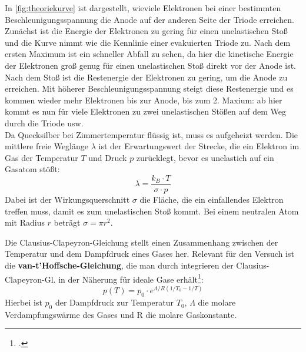 In \cref{fig:theoriekurve} ist dargestellt, wieviele Elektronen bei einer bestimmten Beschleunigungsspannung die Anode auf der anderen Seite der Triode erreichen. Zunächst ist die Energie der Elektronen zu gering für einen unelastischen Stoß und die Kurve nimmt wie die Kennlinie einer evakuierten Triode zu. Nach dem ersten Maximum ist ein schneller Abfall zu sehen, da hier die kinetische Energie der Elektronen groß genug für einen unelastischen Stoß direkt vor der Anode ist. Nach dem Stoß ist die Restenergie der Elektronen zu gering, um die Anode zu erreichen. Mit höherer Beschleunigungsspannung steigt diese Restenergie und es kommen wieder mehr Elektronen bis zur Anode, bis zum 2. Maxium: ab hier kommt es nun für viele Elektronen zu zwei unelastischen Stößen auf dem Weg durch die Triode usw.\\

Da Quecksilber bei Zimmertemperatur flüssig ist, muss es aufgeheizt werden. Die mittlere freie Weglänge $\lambda$ ist der Erwartungswert der Strecke, die ein Elektron im Gas der Temperatur $T$ und Druck $p$ zurücklegt, bevor es unelastich auf ein Gasatom stößt:
\begin{equation}
	\lambda =\frac{k_B\cdot T}{\sigma \cdot p}
	\label{eq:freierweg}
\end{equation}
Dabei ist der Wirkungsquerschnitt $\sigma$ die Fläche, die ein einfallendes Elektron treffen muss, damit es zum unelastischen Stoß kommt. Bei einem neutralen Atom mit Radius $r$ beträgt $\sigma=\pi r^2$.

Die Clausius-Clapeyron-Gleichung stellt einen Zusammenhang zwischen der Temperatur und dem Dampfdruck eines Gases her. Relevant für den Versuch ist die \textbf{van-t'Hoffsche-Gleichung}, die man durch integrieren der Clausius-Clapeyron-Gl. in der Näherung für ideale Gase erhält\footcite[][342]{dermtroeder}:
\begin{equation}
	p(T)=p_0\cdot e^{\Lambda/R(1/T_0-1/T)}
	\label{eq:clausius}
\end{equation}
Hierbei ist $p_0$ der Dampfdruck zur Temperatur $T_0$, $\Lambda$ die molare Verdampfungswärme des Gases und R die molare Gaskonstante.

